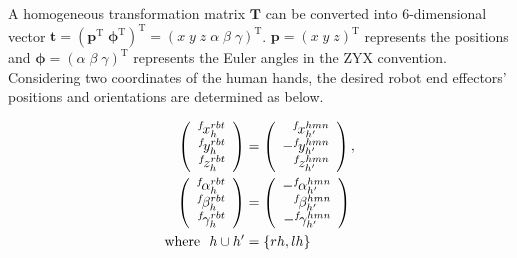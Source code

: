 A homogeneous transformation matrix \(\bm{T}\) can be converted into 6-dimensional vector \(\bm{t} = (\bm{p}^{\mathrm{T}} \; \bm{\phi}^{\mathrm{T}})^{\mathrm{T}} = (x \; y \; z \; \alpha \; \beta \; \gamma)^{\mathrm{T}}\). \(\bm{p} = (x \; y \; z)^{\mathrm{T}}\) represents the positions and \(\bm{\phi} = (\alpha \; \beta \; \gamma)^{\mathrm{T}}\) represents the Euler angles in the ZYX convention. Considering two coordinates of the human hands, the desired robot end effectors' positions and orientations are determined as below. %

\begin{align}
  \left(
  \begin{array}{r}
    ^{f}\!x^{rbt}_{h}\\
    ^{f}\!y^{rbt}_{h}\\
    ^{f}\!z^{rbt}_{h}\\
  \end{array}
  \right)
  &=
  \left(
  \begin{array}{r}
    ^{f}\!x^{hmn}_{h'}\\
    -^{f}\!y^{hmn}_{h'}\\
    ^{f}\!z^{hmn}_{h'}\\
  \end{array}
  \right),\\
  \left(
  \begin{array}{r}
    ^{f}\!\alpha^{rbt}_{h}\\
    ^{f}\!\beta^{rbt}_{h}\\
    ^{f}\!\gamma^{rbt}_{h}\\
  \end{array}
  \right)
  &=
  \left(
  \begin{array}{r}
    -^{f}\!\alpha^{hmn}_{h'}\\
    ^{f}\!\beta^{hmn}_{h'}\\
    -^{f}\!\gamma^{hmn}_{h'}\\
  \end{array}
  \right)\\
  {\rm where} \ \ h \cup h' &= \{rh, lh\} \nonumber
\end{align}

